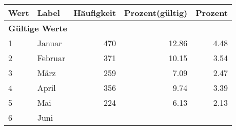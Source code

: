      \begin{longtable}{lXrrr}
     \toprule
     \textbf{Wert} & \textbf{Label} & \textbf{Häufigkeit} & \textbf{Prozent(gültig)} & \textbf{Prozent} \\
     \endhead
     \midrule
     \multicolumn{5}{l}{\textbf{Gültige Werte}}\\

     1 &
     \multicolumn{1}{X}{ Januar   } &


       \num{470} &
       \num[round-mode=places,round-precision=2]{12.86} &
         \num[round-mode=places,round-precision=2]{4.48} \\

     2 &
     \multicolumn{1}{X}{ Februar   } &


       \num{371} &
       \num[round-mode=places,round-precision=2]{10.15} &
         \num[round-mode=places,round-precision=2]{3.54} \\

     3 &
     \multicolumn{1}{X}{ März   } &


       \num{259} &
       \num[round-mode=places,round-precision=2]{7.09} &
         \num[round-mode=places,round-precision=2]{2.47} \\

     4 &
     \multicolumn{1}{X}{ April   } &


       \num{356} &
       \num[round-mode=places,round-precision=2]{9.74} &
         \num[round-mode=places,round-precision=2]{3.39} \\

     5 &
     \multicolumn{1}{X}{ Mai   } &


       \num{224} &
       \num[round-mode=places,round-precision=2]{6.13} &
         \num[round-mode=places,round-precision=2]{2.13} \\

     6 &
     \multicolumn{1}{X}{ Juni   } &



\end{longtable}
